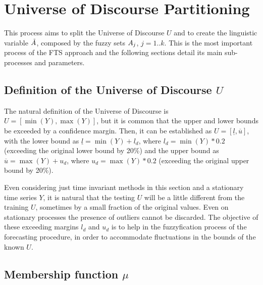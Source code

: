 %
\section{Universe of Discourse Partitioning}
\label{sec:fts_partitioning}

This process aims to split the Universe of Discourse $U$ and to create the linguistic variable $\tilde{A}$, composed by the fuzzy sets $A_j$, $j = 1 .. k$. This is the most important process of the FTS approach and the following sections detail its main sub-processes and parameters.

%
\subsection{Definition of the Universe of Discourse $U$}
\label{sec:fts_uod}

The natural definition of the Universe of Discourse is $U = [\min(Y),\max(Y)]$, but it is common that the upper and lower bounds be exceeded by a confidence margin. Then, it can be established as $U = [\underline{l}, \overline{u}]$, with the lower bound as $\underline{l} = \min(Y) + l_d$, where $l_d = \min(Y)*0.2$ (exceeding the original lower bound by 20\%) and the upper bound as $\overline{u} = \max(Y) + u_d$, where $u_d = \max(Y)*0.2$ (exceeding the original upper bound by 20\%). 

Even considering just time invariant methods in this section and a stationary time series $Y$, it is natural that the testing $U$ will be a little different from the training $U$, sometimes by a small fraction of the original values. Even on stationary processes the presence of outliers cannot be discarded. The objective of these exceeding margins $l_d$ and $u_d$ is to help in the fuzzyfication process of the forecasting procedure, in order to accommodate fluctuations in the bounds of the known $U$.

%
\subsection{Membership function $\mu$}
\label{sec:fts_membership}


